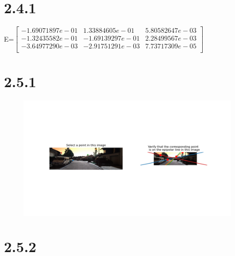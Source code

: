 \documentclass{article}
\begin{document}
    \section*{2.4.1}

    E=$\begin{bmatrix}
        -1.69071897e-01 &  1.33884605e-01 &  5.80582647e-03\\
        -1.32435582e-01 & -1.69139297e-01 &  2.28499567e-03\\
        -3.64977290e-03 & -2.91751291e-03 &  7.73717309e-05\\
    \end{bmatrix}$\\
    \section*{2.5.1}
    \begin{figure}[H]
        \centering
              \includegraphics[width=0.9\linewidth]{../homework/2_5_1_epipolarMatchGUI.png}
    \end{figure}
    \section*{2.5.2}
    
\end{document}
